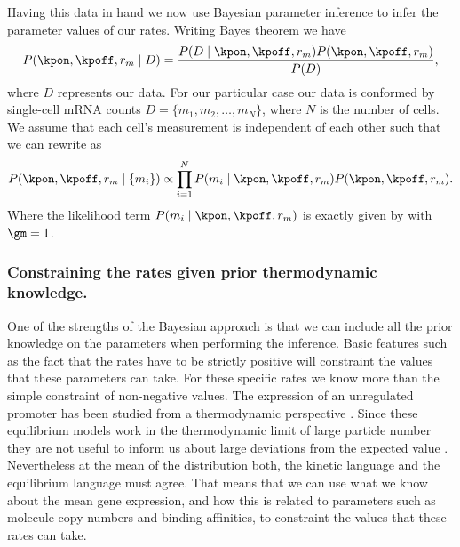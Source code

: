 Having this data in hand we now use Bayesian parameter inference to infer the
parameter values of our rates. Writing Bayes theorem we have
\begin{equation}
  P(\kpon, \kpoff, r_m \mid D) = {P(D \mid \kpon, \kpoff, r_m)
  P(\kpon, \kpoff, r_m) \over P(D)},
  \label{seq_bayes_rnap_rates}
\end{equation}
where $D$ represents our data. For our particular case our data is conformed by
single-cell mRNA counts $D = \{ m_1, m_2, \ldots, m_N \}$, where $N$ is the
number of cells. We assume that each cell's measurement is independent of each
other such that we can rewrite
 as
\begin{equation}
  P(\kpon, \kpoff, r_m \mid \{m_i\}) \propto
  \prod_{i=1}^N P(m_i \mid \kpon, \kpoff, r_m)
  P(\kpon, \kpoff, r_m).
  \label{seq_bayes_sample}
\end{equation}
Where the likelihood term $P(m_i \mid \kpon, \kpoff, r_m)$ is exactly given by
 with $\gm = 1$.

\subsubsection*{Constraining the rates given prior thermodynamic knowledge.}

One of the strengths of the Bayesian approach is that we can include all the
prior knowledge on the parameters when performing the
inference\cite{MacKay2003}. Basic features such as the fact that the rates have
to be strictly positive will constraint the values that these parameters can
take. For these specific rates we know more than the simple constraint of
non-negative values. The expression of an unregulated promoter has been studied
from a thermodynamic perspective \cite{Brewster2012}. Since these equilibrium
models work in the thermodynamic limit of large particle number they are not
useful to inform us about large deviations from the expected value . Nevertheless at
the mean of the distribution both, the kinetic language and the equilibrium
language must agree. That means that we can use what we know about the mean gene
expression, and how this is related to parameters such as molecule copy numbers
and binding affinities, to constraint the values that these rates can take.

